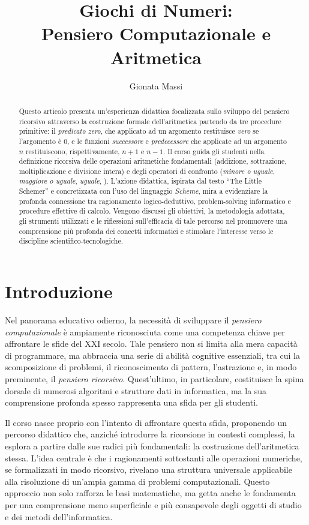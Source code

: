 \documentclass[withtimes]{easychair}
\title{Giochi di Numeri:\\Pensiero Computazionale e Aritmetica}
\author{
Gionata Massi%
}
\institute{
   Istituto di Istruzione Superiore Savoia Benincasa\\
   Ancona, Italia\\
   \email{gionata.massi@savoiabenincasa.it}
}
\begin{document}
\maketitle


\begin{abstract}
  Questo articolo presenta un'esperienza didattica focalizzata sullo sviluppo del pensiero ricorsivo attraverso la costruzione formale dell'aritmetica partendo da tre procedure primitive: il \emph{predicato zero}, che applicato ad un argomento restituisce \emph{vero} se l'argomento è 0, e le funzioni \emph{successore} e \emph{predecessore} che applicate ad un argomento $n$ restituiscono, rispettivamente, $n+1$ e $n-1$. Il corso guida gli studenti nella definizione ricorsiva delle operazioni aritmetiche fondamentali (addizione, sottrazione, moltiplicazione e divisione intera) e degli operatori di confronto (\emph{minore o uguale}, \emph{maggiore o uguale}, \emph{uguale}, \textellipsis). L'azione didattica, ispirata dal testo ``The Little Schemer'' e concretizzata con l'uso del linguaggio \emph{Scheme}, mira a evidenziare la profonda connessione tra ragionamento logico-deduttivo, problem-solving informatico e procedure effettive di calcolo. Vengono discussi gli obiettivi, la metodologia adottata, gli strumenti utilizzati e le riflessioni sull'efficacia di tale percorso nel promuovere una comprensione più profonda dei concetti informatici e stimolare l'interesse verso le discipline scientifico-tecnologiche.
\end{abstract}

\section{Introduzione}\label{introduzione}

Nel panorama educativo odierno, la necessità di sviluppare il \emph{pensiero computazionale} è ampiamente riconosciuta come una competenza chiave per affrontare le sfide del XXI secolo. Tale pensiero non si limita alla mera capacità di programmare, ma abbraccia una serie di abilità cognitive essenziali, tra cui la scomposizione di problemi, il riconoscimento di pattern, l'astrazione e, in modo preminente, il \emph{pensiero ricorsivo}. Quest'ultimo, in particolare, costituisce la spina dorsale di numerosi algoritmi e strutture dati in informatica, ma la sua comprensione profonda spesso rappresenta una sfida per gli studenti.

Il corso nasce proprio con l'intento di affrontare questa sfida, proponendo un percorso didattico che, anziché introdurre la ricorsione in contesti complessi, la esplora a partire dalle sue radici più fondamentali: la costruzione dell'aritmetica stessa. L'idea centrale è che i ragionamenti sottostanti alle operazioni numeriche, se formalizzati in modo ricorsivo, rivelano una struttura universale applicabile alla risoluzione di un'ampia gamma di problemi computazionali. Questo approccio non solo rafforza le basi matematiche, ma getta anche le fondamenta per una comprensione meno superficiale e più consapevole degli oggetti di studio e dei metodi dell'informatica.
\end{document}
